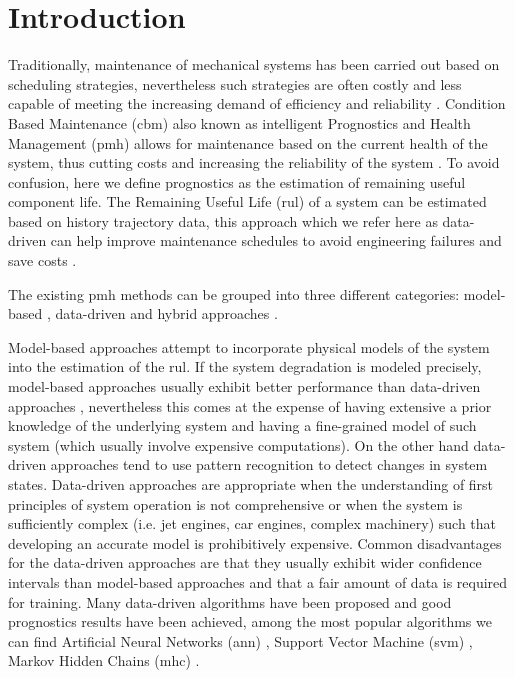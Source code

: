 \section{Introduction}
\label{sec:rul_intro}

Traditionally, maintenance of mechanical systems has been carried out based on scheduling strategies, nevertheless such strategies are often costly and less capable of meeting the increasing demand of efficiency and reliability \cite{Gebraeel2005, Zaidan2013}. Condition Based Maintenance (\gls{cbm}) also known as intelligent Prognostics and Health Management (\gls{pmh}) allows for maintenance based on the current health of the system, thus cutting costs and increasing the reliability of the system \cite{Zhao2017}. To avoid confusion, here we define prognostics as the estimation of remaining useful component life. The Remaining Useful Life (\gls{rul}) of a system can be estimated based on history trajectory data, this approach which we refer here as data-driven can help improve maintenance schedules to avoid engineering failures and save costs \cite{Lee2014}.

The existing \gls{pmh} methods can be grouped into three different categories: model-based \cite{Yu2001} , data-driven \cite{Liu2009, Mosallam2013} and hybrid approaches \cite{Pecht2010, Liu2012}.

Model-based approaches attempt to incorporate physical models of the system into the estimation of the \gls{rul}. If the system degradation is modeled  precisely, model-based approaches usually exhibit better performance than data-driven approaches \cite{Qian2017}, nevertheless this comes at the expense of having extensive a prior knowledge of the underlying system and having a fine-grained model of such system (which usually involve expensive computations). On the other hand data-driven approaches tend to use pattern recognition to detect changes in system states. Data-driven approaches are appropriate when the understanding of first principles of system operation is not comprehensive or when the system is sufficiently complex (i.e. jet engines, car engines, complex machinery) such that developing an accurate model is prohibitively expensive. Common disadvantages for the data-driven approaches are that they usually exhibit wider confidence intervals than model-based approaches and that a fair amount of data is required for training. Many data-driven algorithms have been proposed and good prognostics results have been achieved, among the most popular algorithms we can find Artificial Neural Networks (\gls{ann}) \cite{Gebraeel2004}, Support Vector Machine (\gls{svm}) \cite{Benkedjouh2013}, Markov Hidden Chains (\gls{mhc}) \cite{Dong2007}.

